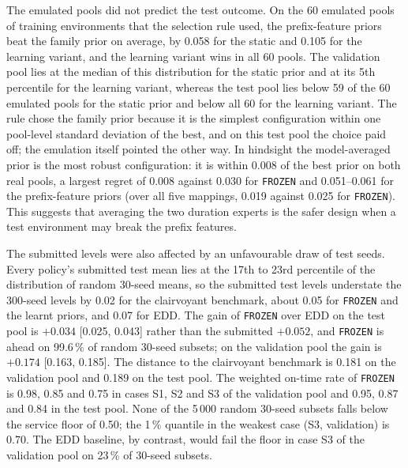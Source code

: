 The emulated pools did not predict the test outcome. On the 60 emulated pools of training environments that the selection rule used, the prefix-feature priors beat the family prior on average, by 0.058 for the static and 0.105 for the learning variant, and the learning variant wins in all 60 pools. The validation pool lies at the median of this distribution for the static prior and at its 5th percentile for the learning variant, whereas the test pool lies below 59 of the 60 emulated pools for the static prior and below all 60 for the learning variant. The rule chose the family prior because it is the simplest configuration within one pool-level standard deviation of the best\cite{esl}, and on this test pool the choice paid off; the emulation itself pointed the other way. In hindsight the model-averaged prior is the most robust configuration: it is within 0.008 of the best prior on both real pools, a largest regret of 0.008 against 0.030 for \texttt{FROZEN} and 0.051--0.061 for the prefix-feature priors (over all five mappings, 0.019 against 0.025 for \texttt{FROZEN}). This suggests that averaging the two duration experts is the safer design when a test environment may break the prefix features.

The submitted levels were also affected by an unfavourable draw of test seeds. Every policy's submitted test mean lies at the 17th to 23rd percentile of the distribution of random 30-seed means, so the submitted test levels understate the 300-seed levels by 0.02 for the clairvoyant benchmark, about 0.05 for \texttt{FROZEN} and the learnt priors, and 0.07 for EDD. The gain of \texttt{FROZEN} over EDD on the test pool is $+0.034$ [0.025, 0.043] rather than the submitted $+0.052$, and \texttt{FROZEN} is ahead on 99.6\,\% of random 30-seed subsets; on the validation pool the gain is $+0.174$ [0.163, 0.185]. The distance to the clairvoyant benchmark is 0.181 on the validation pool and 0.189 on the test pool. The weighted on-time rate of \texttt{FROZEN} is 0.98, 0.85 and 0.75 in cases S1, S2 and S3 of the validation pool and 0.95, 0.87 and 0.84 in the test pool. None of the 5\,000 random 30-seed subsets falls below the service floor of 0.50; the 1\,\% quantile in the weakest case (S3, validation) is 0.70. The EDD baseline, by contrast, would fail the floor in case S3 of the validation pool on 23\,\% of 30-seed subsets.

